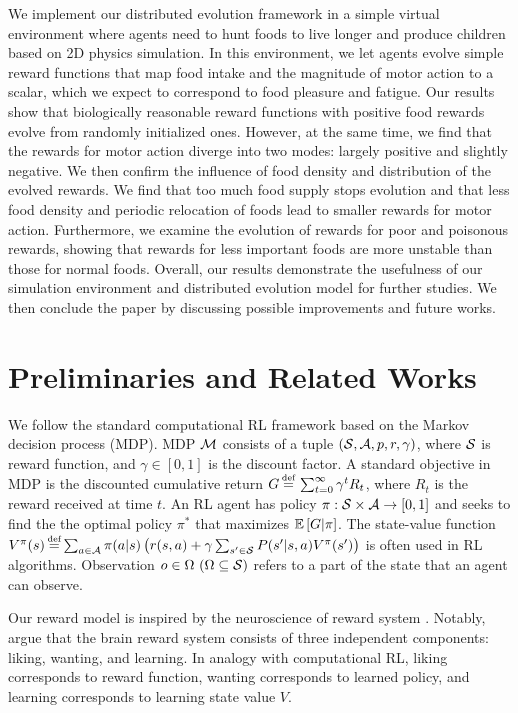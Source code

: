 We implement our distributed evolution framework in a simple virtual environment where agents need to hunt foods to live longer and produce children based on 2D physics simulation. In this environment, we let agents evolve simple reward functions that map food intake and the magnitude of motor action to a scalar, which we expect to correspond to food pleasure and fatigue. Our results show that biologically reasonable reward functions with positive food rewards evolve from randomly initialized ones.  However, at the same time, we find that the rewards for motor action diverge into two modes: largely positive and slightly negative. We then confirm the influence of food density and distribution of the evolved rewards. We find that too much food supply stops evolution and that less food density and periodic relocation of foods lead to smaller rewards for motor action. Furthermore, we examine the evolution of rewards for poor and poisonous rewards, showing that rewards for less important foods are more unstable than those for normal foods. Overall, our results demonstrate the usefulness of our simulation environment and distributed evolution model for further studies. We then conclude the paper by discussing possible improvements and future works.

\section{Preliminaries and Related Works}\label{sec:related}
We follow the standard computational RL framework \citep{suttonReinforcementLearningIntroduction2018} based on the Markov decision process (MDP). MDP $\mathcal{M}{}$ consists of a tuple $(\mathcal{S}{}, \mathcal{A}{}, p, r, \gamma)$, where $\mathcal{S}{}$ is reward function, and $\gamma \in [0, 1]$ is the discount factor. A standard objective in MDP is the discounted cumulative return $G \defequal{} \sum_{t=0}^{\infty}\gamma^t R_{t}$, where $R_t$ is the reward received at time $t$. An RL agent has policy $\pi: \mathcal{S} \times \mathcal{A} \rightarrow [0, 1]$ and seeks to find the the optimal policy $\pi^{*}$ that maximizes $\mathbb{E} \left[G|\pi\right]$. The state-value function $V^\pi(s) \defequal \sum_{a \in \A} \pi(a|s) \left( r(s, a) + \gamma \sum_{s' \in \X} P(s'|s, a) V^\pi(s') \right)$ is often used in RL algorithms. Observation $o \in \Omega~(\Omega \subseteq \mathcal{S})$ refers to a part of the state that an agent can observe.

Our reward model is inspired by the neuroscience of reward system \citep{schultzNeuronalRewardDecision2015, berridgePleasureSystemsBrain2015}. Notably, \citet{berridgeDissectingComponentsReward2009} argue that the brain reward system consists of three independent components: liking, wanting, and learning. In analogy with computational RL, liking corresponds to reward function, wanting corresponds to learned policy, and learning corresponds to learning state value $V$.

